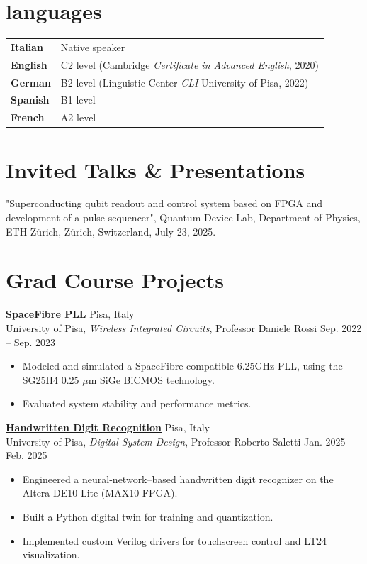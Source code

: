 \documentclass[11pt]{article}
\newcommand{\entry}[4]{{{\textbf{#1}}} \hfill #3 \\ #2 \hfill #4}
\begin{document}
	\section{languages}
	\begin{tabular}{l l}
		\textbf{Italian} & Native speaker \\
		\textbf{English} & C2 level (Cambridge \textit{Certificate in Advanced English}, 2020) \\
		\textbf{German} & B2 level (Linguistic Center \textit{CLI} University of Pisa, 2022) \\
		\textbf{Spanish} & B1 level \\
		\textbf{French} & A2 level
	\end{tabular}
	
	\section{Invited Talks \& Presentations}
	"Superconducting qubit readout and control system based on FPGA and development of a pulse sequencer", Quantum Device Lab, Department of Physics, ETH Zürich, Zürich, Switzerland, July 23, 2025.
	
	\section{Grad Course Projects}
	
	\entry{\href{https://github.com/leonardobove/spacefibre_pll}{SpaceFibre PLL}}{University of Pisa, \textit{Wireless Integrated Circuits}, Professor Daniele Rossi}{Pisa, Italy}{Sep. 2022 -- Sep. 2023}
	\begin{itemize}[noitemsep,leftmargin=10.0mm,rightmargin=0mm,topsep=6pt]
		\item Modeled and simulated a SpaceFibre-compatible 6.25GHz PLL, using the SG25H4 0.25 \(\mu\)m SiGe BiCMOS technology.
		\item Evaluated system stability and performance metrics.
	\end{itemize}
	
	
	\entry{\href{https://github.com/leonardobove/handwritten_digit_recognition}{Handwritten Digit Recognition}}{University of Pisa, \textit{Digital System Design}, Professor Roberto Saletti}{Pisa, Italy}{Jan. 2025 -- Feb. 2025}
	\begin{itemize}[noitemsep,leftmargin=10.0mm,rightmargin=0mm,topsep=6pt]
		\item Engineered a neural-network–based handwritten digit recognizer on the Altera DE10-Lite (MAX10 FPGA).
		\item Built a Python digital twin for training and quantization.
		\item Implemented custom Verilog drivers for touchscreen control and LT24 visualization.
	\end{itemize}
	
\end{document}
